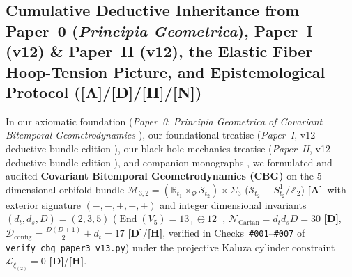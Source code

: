 \documentclass[11pt,a4paper]{article}
\newcommand{\catA}{\textbf{\textcolor{purple!80!black}{[A]}}}
\newcommand{\catD}{\textbf{\textcolor{blue!75!black}{[D]}}}
\newcommand{\catH}{\textbf{\textcolor{orange!85!black}{[H]}}}
\newcommand{\catN}{\textbf{\textcolor{teal!75!black}{[N]}}}
\theoremstyle{plain}
\theoremstyle{definition}
\theoremstyle{remark}
\numberwithin{equation}{section}
\begin{document}
\subsection{\texorpdfstring{Cumulative Deductive Inheritance from Paper~0 (\textit{Principia Geometrica}), Paper~I (v12) \& Paper~II (v12), the Elastic Fiber Hoop-Tension Picture, and Epistemological Protocol (\catA/\catD/\catH/\catN)}{Cumulative Deductive Inheritance from Paper 0, Paper I (v12) and Paper II (v12), the Elastic Fiber Hoop-Tension Picture, and Epistemological Protocol ([A]/[D]/[H]/[N])}}

In our axiomatic foundation (\textit{Paper~0}: \textit{Principia Geometrica of Covariant Bitemporal Geometrodynamics} \cite{jimenez2026_p0}), our foundational treatise (\textit{Paper~I}, v12 deductive bundle edition \cite{jimenez2026a}), our black hole mechanics treatise (\textit{Paper~II}, v12 deductive bundle edition \cite{jimenez2026b}), and companion monographs \cite{JV_PaperIV}, we formulated and audited \textbf{Covariant Bitemporal Geometrodynamics (CBG)} on the 5-dimensional orbifold bundle $\mathcal{M}_{3,2} = (\mathbb{R}_{t_1} \times_{\Phi} \mathcal{S}_{t_2}) \times \Sigma_3$ ($\mathcal{S}_{t_2} \equiv S^1_{t_2}/\mathbb{Z}_2$) \catA\ with exterior signature $(-,-,+,+,+)$ and integer dimensional invariants $(d_t, d_s, D) = (2, 3, 5)$ ($\operatorname{End}(V_5) = 13_+ \oplus 12_-$, $\mathcal{N}_{\text{Cartan}} = d_t d_s D = 30$ \catD, $\mathcal{D}_{\text{config}} = \frac{D(D+1)}{2} + d_t = 17$ \catD/\catH, verified in Checks~\texttt{\#001}--\texttt{\#007} of \allowbreak\texttt{verify\_cbg\_paper3\_v13.py}) under the projective Kaluza cylinder constraint $\mathcal{L}_{\xi_{(2)}} = 0$ \catD/\catH.
\end{document}
